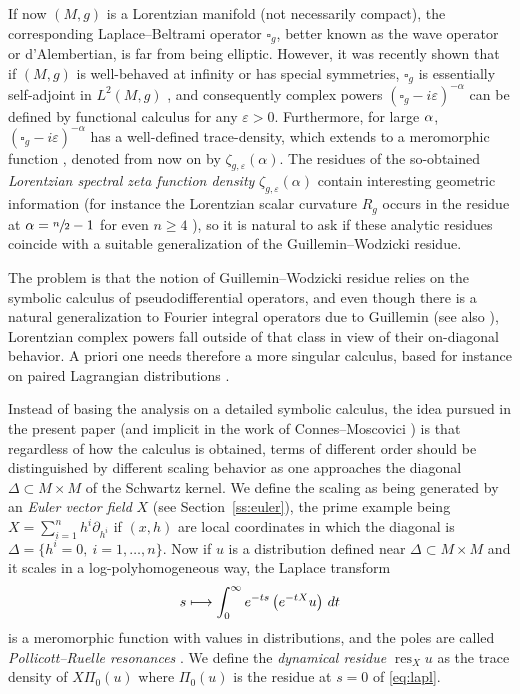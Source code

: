 \documentclass[10pt]{amsart}
\def\mto{\mathchoice{\longmapsto}{\mapsto}{\mapsto}{\mapsto}}
\theoremstyle{definition}
\let\cv\alpha
\let\euler X
\let\p\partial
\let\Re\relax
\DeclareMathOperator{\Re}{Re}
\DeclareMathOperator*{\res}{res}
\renewcommand{\sec}[1]{Section~\ref{#1}}
\begin{document}
If now $(M,g)$ is a Lorentzian manifold (not necessarily compact), the corresponding Laplace--Beltrami operator $\square_g$, better known as the wave operator or d'Alembertian, is far from being elliptic. However, it was recently shown that if $(M,g)$ is well-behaved at infinity or has special symmetries, $\square_g$ is essentially self-adjoint in $L^2(M,g)$ \cite{derezinski,vasyessential,nakamurataira,Derezinski2019}, and consequently complex powers $(\square_g-i \varepsilon)^{-\cv}$ can be defined by functional calculus for any $\varepsilon>0$. Furthermore, for large $\Re \cv$, $(\square_g-i \varepsilon)^{-\cv}$ has a well-defined trace-density, which extends to a meromorphic function \cite{Dang2020}, denoted from now on by $\zeta_{g,\varepsilon}(\cv)$. The residues of the so-obtained \emph{Lorentzian spectral zeta function density} $\zeta_{g,\varepsilon}(\cv)$ contain interesting geometric information (for instance the Lorentzian scalar curvature $R_g$ occurs in the residue at $\cv=\sfrac{n}{2}-1$ for even $n\geqslant4$ \cite{Dang2020}), so it is natural to ask if these analytic residues coincide with a suitable generalization of the Guillemin--Wodzicki residue.

The problem is that the notion of Guillemin--Wodzicki residue relies on the symbolic calculus of pseudo\-differential operators, and even though there is a natural generalization to Fourier integral operators due to Guillemin \cite{Guillemin1993} (see also \cite{Hartung2015}), Lorentzian complex powers fall outside of that class in view of their on-diagonal behavior. A priori one needs therefore a more singular calculus, based for instance on paired Lagrangian distributions \cite{Guillemin1981,Melrose1979,Antoniano1985,Greenleaf1990,joshi,Joshi1998}.

Instead of basing the analysis on a detailed symbolic calculus, the idea pursued in the present paper (and implicit in the work of Connes--Moscovici \cite{Connes1995}) is that regardless of how the calculus is obtained, terms of different order should be distinguished by different scaling behavior as one approaches the diagonal $\Delta\subset M\times M$ of the Schwartz kernel. We define the scaling as being generated by an \emph{Euler vector field} $\euler$ (see \sec{ss:euler}), the prime example being $X=\sum_{i=1}^n h^i \p_{h^i}$ if $(x,h)$ are local coordinates in which the diagonal is $\Delta=\{h^{i}=0, \ i=1,\dots,n \}$. Now if $u$ is a distribution defined near $\Delta\subset M\times M$ and it scales in a log-polyhomogeneous way, the Laplace transform
\begin{equation}\label{eq:lapl}
s\mto \int_0^\infty e^{-ts} \left(e^{-t\euler}u\right) \,dt
\end{equation}
is a meromorphic function with values in distributions, and the poles are called \emph{Pollicott--Ruelle resonances} \cite{Pollicott1986,Ruelle1986}. We define the \emph{dynamical residue} $\res_X u$ as the trace density of $X \Pi_0(u)$ where $\Pi_0(u)$ is the residue at $s=0$ of \eqref{eq:lapl}.
\end{document}
